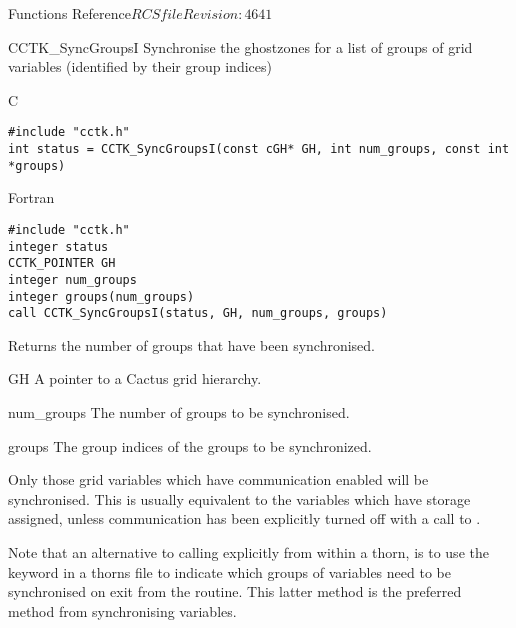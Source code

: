 \begin{cactuspart}{ Functions Reference}{$RCSfile$}{$Revision: 4641 $}
\begin{FunctionDescription}{CCTK\_SyncGroupsI}
\label{CCTK-SyncGroupsI}
Synchronise the ghostzones for a list of groups of grid variables
(identified by their group indices)

\begin{SynopsisSection}
\begin{Synopsis}{C}
\begin{verbatim}
#include "cctk.h"
int status = CCTK_SyncGroupsI(const cGH* GH, int num_groups, const int *groups)
\end{verbatim}
\end{Synopsis}
\begin{Synopsis}{Fortran}
\begin{verbatim}
#include "cctk.h"
integer status
CCTK_POINTER GH
integer num_groups
integer groups(num_groups)
call CCTK_SyncGroupsI(status, GH, num_groups, groups)
\end{verbatim}
\end{Synopsis}
\end{SynopsisSection}

\begin{ResultSection}
\begin{Result}{0}
Returns the number of groups that have been synchronised.
\end{Result}
\end{ResultSection}

\begin{ParameterSection}
\begin{Parameter}{GH}
A pointer to a Cactus grid hierarchy.
\end{Parameter}
\begin{Parameter}{num\_groups}
The number of groups to be synchronised.
\end{Parameter}
\begin{Parameter}{groups}
The group indices of the groups to be synchronized.
\end{Parameter}
\end{ParameterSection}

\begin{Discussion}
Only those grid variables which have communication enabled
will be synchronised. This is usually equivalent to the variables
which have storage assigned, unless communication has been explicitly
turned off with a call to .

Note that an alternative to calling  explicitly
from within a thorn, is to use the  keyword in a thorns
 file to indicate which groups of variables need
to be synchronised on exit from the routine. This latter method is
the preferred method from synchronising variables.


\end{Discussion}
\end{FunctionDescription}
\end{cactuspart}

